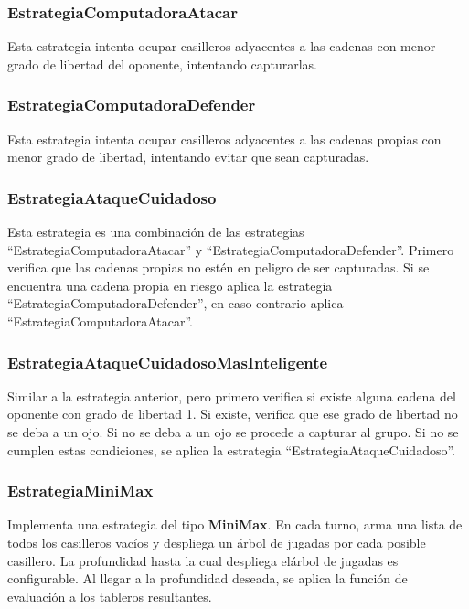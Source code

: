 \documentclass[11pt]{article}
\begin{document}
\subsubsection{EstrategiaComputadoraAtacar}
\label{sec-4.3.1}

    Esta estrategia intenta ocupar casilleros adyacentes a las cadenas
    con menor grado de libertad del oponente, intentando capturarlas.
\subsubsection{EstrategiaComputadoraDefender}
\label{sec-4.3.2}

    Esta estrategia intenta ocupar casilleros adyacentes a las cadenas
    propias con menor grado de libertad, intentando evitar que sean
    capturadas.
\subsubsection{EstrategiaAtaqueCuidadoso}
\label{sec-4.3.3}

    Esta estrategia es una combinación de las estrategias
    ``EstrategiaComputadoraAtacar'' y
    ``EstrategiaComputadoraDefender''. Primero verifica que las
    cadenas propias no estén en peligro de ser capturadas. Si se
    encuentra una cadena propia en riesgo aplica la estrategia
    ``EstrategiaComputadoraDefender'', en caso contrario aplica
    ``EstrategiaComputadoraAtacar''.
\subsubsection{EstrategiaAtaqueCuidadosoMasInteligente}
\label{sec-4.3.4}

    Similar a la estrategia anterior, pero primero verifica si existe
    alguna cadena del oponente con grado de libertad 1. Si existe,
    verifica que ese grado de libertad no se deba a un ojo. Si no se
    deba a un ojo se procede a capturar al grupo. Si no se cumplen
    estas condiciones, se aplica la estrategia
    ``EstrategiaAtaqueCuidadoso''.

\subsubsection{EstrategiaMiniMax}

   Implementa una estrategia del tipo {\bf MiniMax}. En cada turno,
   arma una lista de todos los casilleros vac\'ios y despliega un
   \'arbol de jugadas por cada posible casillero. La profundidad hasta
   la cual despliega el\'arbol de jugadas es configurable. Al llegar a
   la profundidad deseada, se aplica la funci\'on de evaluaci\'on a
   los tableros resultantes.
   
\end{document}
